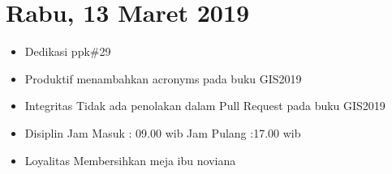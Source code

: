 \section{Rabu, 13 Maret 2019}
\begin{itemize}
\item Dedikasi
\subitem ppk\#29
\item Produktif
  \subitem menambahkan acronyms pada buku GIS2019
\item Integritas
  \subitem Tidak ada penolakan dalam Pull Request pada buku GIS2019
\item Disiplin
  \subitem Jam Masuk : 09.00 wib
  \subitem Jam Pulang :17.00 wib
\item Loyalitas
  \subitem Membersihkan meja ibu noviana
\end{itemize}